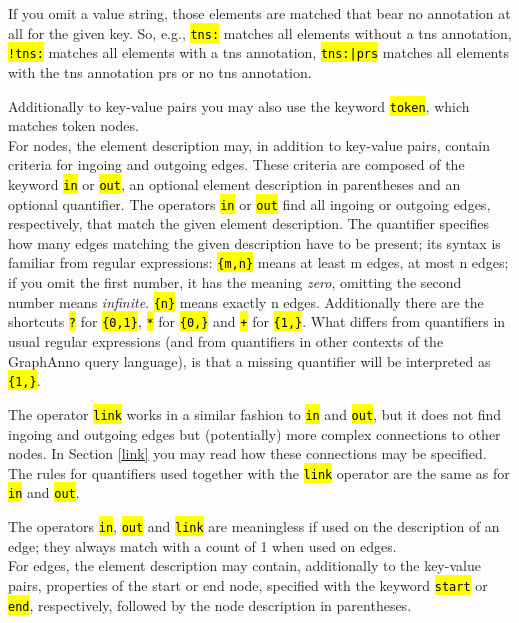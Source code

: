 \documentclass[12pt]{scrartcl}
\newcommand{\code}[1]{\hl{\texttt{#1}}}
\begin{document}
If you omit a value string, those elements are matched that bear no annotation at all for the given key. So, e.g., \code{tns:} matches all elements without a tns annotation, \code{!tns:} matches all elements with a tns annotation, \code{tns:|prs} matches all elements with the tns annotation prs or no tns annotation.

Additionally to key-value pairs you may also use the keyword \code{token}, which matches token nodes.\\

\label{quantifiers}For nodes, the element description may, in addition to key-value pairs, contain criteria for ingoing and outgoing edges.
These criteria are composed of the keyword \code{in} or \code{out}, an optional element description in parentheses and an optional quantifier.
The operators \code{in} or \code{out} find all ingoing or outgoing edges, respectively, that match the given element description.
The quantifier specifies how many edges matching the given description have to be present; its syntax is familiar from regular expressions:
\code{\{m,n\}} means at least m edges, at most n edges; if you omit the first number, it has the meaning \textit{zero}, omitting the second number means \textit{infinite}.
\code{\{n\}} means exactly n edges.
Additionally there are the shortcuts \code{?} for \code{\{0,1\}}, \code{*} for \code{\{0,\}} and \code{+} for \code{\{1,\}}.
What differs from quantifiers in usual regular expressions (and from quantifiers in other contexts of the GraphAnno query language), is that a missing quantifier will be interpreted as \code{\{1,\}}.

The operator \code{link} works in a similar fashion to \code{in} and \code{out}, but it does not find ingoing and outgoing edges but (potentially) more complex connections to other nodes.
In Section \ref{link} you may read how these connections may be specified.
The rules for quantifiers used together with the \code{link} operator are the same as for \code{in} and \code{out}.

The operators \code{in}, \code{out} and \code{link} are meaningless if used on the description of an edge; they always match with a count of 1 when used on edges.\\

For edges, the element description may contain, additionally to the key-value pairs, properties of the start or end node, specified with the keyword \code{start} or \code{end}, respectively, followed by the node description in parentheses.
\end{document}
